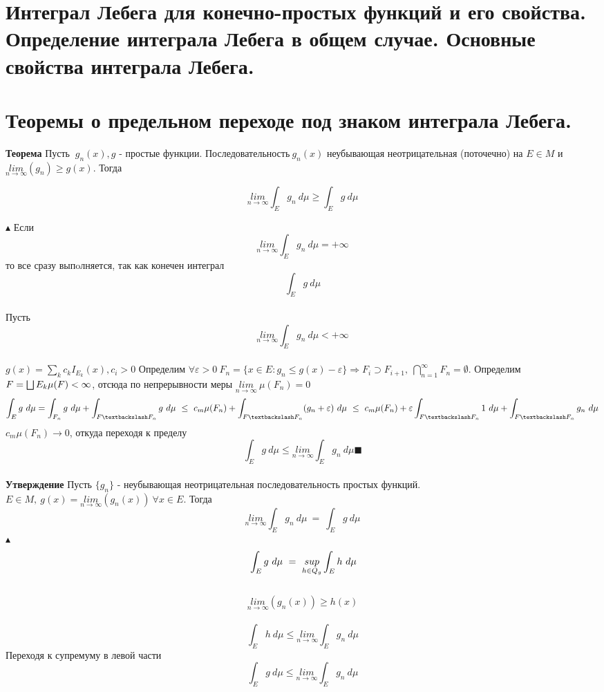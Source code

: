 \section{Интеграл Лебега для конечно-простых функций и его свойства. Определение интеграла Лебега в общем случае. Основные свойства интеграла Лебега.}

\newpage{}

\section{Теоремы о предельном переходе под знаком интеграла Лебега.}
\textbf{Теорема} Пусть $\ g_n(x), g$ - простые функции. Последовательность$\ g_n(x)$ неубывающая неотрицательная (поточечно) на $E \in M$ и $\underset{n\rightarrow \infty}{lim}(g_n) \geq g(x)$. Тогда 
\begin{center}
    $$\underset{n\rightarrow \infty}{lim}\int_E g_n \ d\mu \geq \int_E g \ d\mu$$
\end{center}
$\blacktriangle $
Если $$\underset{n\rightarrow \infty}{lim}\int_E g_n \ d\mu = +\infty$$то все сразу выпoлняется, так как конечен интеграл $$\int_E g \ d\mu$$
\\
Пусть  $$\underset{n\rightarrow \infty}{lim}\int_E g_n \ d\mu <+\infty$$
\\
 $g(x) = \sum\limits_k c_kI_{E_k}(x), c_i > 0$ Определим $\forall \varepsilon > 0 \ F_n = \{x\in E: g_n \leq g(x) - \varepsilon \} \Longrightarrow F_i \supset F_{i+1}, \  \bigcap_{n=1}^{\infty} F_n = \emptyset$. Определим $F = \bigsqcup E_k \\ \mu(F) < \infty$, отсюда по непрерывности меры $\underset{n\rightarrow \infty}{lim} \ \mu(F_n) = 0$
 $$\int_E g \ d\mu = \int_{F_n} g \ d\mu + \int_{F\textbackslash F_n}g \ d\mu \ \leq \ c_m\mu(F_n) + \int_{F\textbackslash F_n}(g_n + \varepsilon) \ d\mu \ \leq \ c_m\mu(F_n) + \varepsilon\int_{F\textbackslash F_n} 1 \ d \mu + \int_{F\textbackslash F_n} g_n \ d \mu$$
 $c_m\mu(F_n) \rightarrow 0$, откуда переходя к пределу $$\int_E g \ d\mu \leq \underset{n\rightarrow \infty}{lim} \int_E g_n \ d\mu \blacksquare$$
 \\
 \textbf{Утверждение} Пусть $\{g_n\}$ - неубывающая неотрицательная последовательность простых функций. $E \in M, \ g(x) = \underset{n\rightarrow \infty}{lim}(g_n(x)) \ \forall x \in E$. Тогда 
   $$\underset{n\rightarrow \infty}{lim}\int_E g_n \ d\mu \ = \ \int_E g \ d\mu$$
 $\blacktriangle $ $$\\ \int_E g \ d\mu \ = \ \underset{h \in Q_g}{sup} \int_E h \ d\mu$$ \\  $$\underset{n\rightarrow \infty}{lim}(g_n(x)) \geq h(x)$$ \\$$ \int_E h \ d\mu \leq \underset{n\rightarrow \infty}{lim} \int_E g_n \ d\mu $$ Переходя к супремуму в левой части \\ $$ \int_E g \ d\mu \leq \underset{n\rightarrow \infty}{lim} \int_E g_n \ d\mu $$
